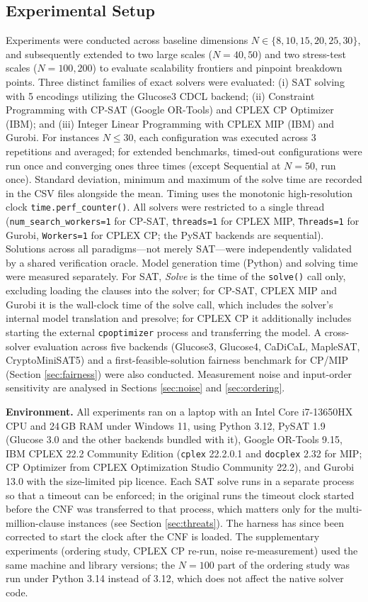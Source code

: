 \documentclass[a4paper,fleqn]{cas-sc}
\begin{document}
\subsection{Experimental Setup}
Experiments were conducted across baseline dimensions $N \in \{8, 10, 15, 20, 25, 30\}$, and subsequently extended to two large scales ($N=40, 50$) and two stress-test scales ($N=100, 200$) to evaluate scalability frontiers and pinpoint breakdown points. Three distinct families of exact solvers were evaluated: (i) SAT solving with 5 encodings utilizing the Glucose3 CDCL backend; (ii) Constraint Programming with CP-SAT (Google OR-Tools) and CPLEX CP Optimizer (IBM); and (iii) Integer Linear Programming with CPLEX MIP (IBM) and Gurobi. For instances $N \leq 30$, each configuration was executed across 3 repetitions and averaged; for extended benchmarks, timed-out configurations were run once and converging ones three times (except Sequential at $N=50$, run once). Standard deviation, minimum and maximum of the solve time are recorded in the CSV files alongside the mean. Timing uses the monotonic high-resolution clock \texttt{time.perf\_counter()}. All solvers were restricted to a single thread (\texttt{num\_search\_workers=1} for CP-SAT, \texttt{threads=1} for CPLEX MIP, \texttt{Threads=1} for Gurobi, \texttt{Workers=1} for CPLEX CP; the PySAT backends are sequential). Solutions across all paradigms—not merely SAT—were independently validated by a shared verification oracle. Model generation time (Python) and solving time were measured separately. For SAT, \emph{Solve} is the time of the \texttt{solve()} call only, excluding loading the clauses into the solver; for CP-SAT, CPLEX MIP and Gurobi it is the wall-clock time of the solve call, which includes the solver's internal model translation and presolve; for CPLEX CP it additionally includes starting the external \texttt{cpoptimizer} process and transferring the model. A cross-solver evaluation across five backends (Glucose3, Glucose4, CaDiCaL, MapleSAT, CryptoMiniSAT5) and a first-feasible-solution fairness benchmark for CP/MIP (Section \ref{sec:fairness}) were also conducted. Measurement noise and input-order sensitivity are analysed in Sections \ref{sec:noise} and \ref{sec:ordering}.

\textbf{Environment.} All experiments ran on a laptop with an Intel Core i7-13650HX CPU and 24\,GB RAM under Windows 11, using Python 3.12, PySAT 1.9 (Glucose 3.0 and the other backends bundled with it), Google OR-Tools 9.15, IBM CPLEX 22.2 Community Edition (\texttt{cplex} 22.2.0.1 and \texttt{docplex} 2.32 for MIP; CP Optimizer from CPLEX Optimization Studio Community 22.2), and Gurobi 13.0 with the size-limited pip licence. Each SAT solve runs in a separate process so that a timeout can be enforced; in the original runs the timeout clock started before the CNF was transferred to that process, which matters only for the multi-million-clause instances (see Section \ref{sec:threats}). The harness has since been corrected to start the clock after the CNF is loaded. The supplementary experiments (ordering study, CPLEX CP re-run, noise re-measurement) used the same machine and library versions; the $N=100$ part of the ordering study was run under Python 3.14 instead of 3.12, which does not affect the native solver code.
\end{document}
